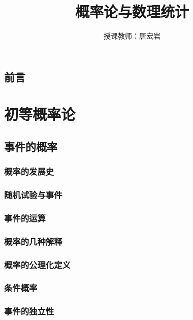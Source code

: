 \documentclass[zihao=-4,linespread=1.5,a4paper,heading=true,oneside]{ctexbook}
\title{概率论与数理统计}
\author{授课教师：唐宏岩}
\date{}
\theoremstyle{definition}
\begin{document}
\maketitle

\chapter*{前言}\label{chap:preface}

\tableofcontents

\newpage
{}
\part{初等概率论}\label{part:1}

\chapter{事件的概率}\label{chap:1}
\section{概率的发展史}\label{sec:1.1}

\section{随机试验与事件}\label{sec:1.2}

\section{事件的运算}\label{sec:1.3}

\section{概率的几种解释}\label{sec:1.4}

\section{概率的公理化定义}\label{sec:1.5}

\section{条件概率}\label{sec:1.6}

\section{事件的独立性}\label{sec:1.7}

\end{document}
